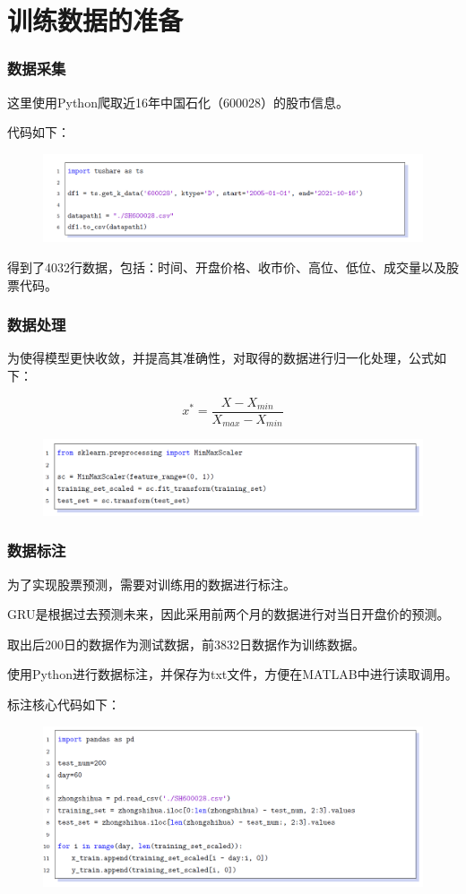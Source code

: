 \documentclass[aspectratio=169, 10pt, utf8, mathserif]{beamer}
\begin{document}
\section{训练数据的准备}
\begin{frame}
	\frametitle{数据采集}
	这里使用Python爬取近16年中国石化（600028）的股市信息。
	
	代码如下：
	\begin{figure}[H]
		\centering
		\includegraphics[width=1\linewidth]{pic/screenshot032}
		\label{fig:screenshot032}
	\end{figure}
	
得到了4032行数据，包括：时间、开盘价格、收市价、高位、低位、成交量以及股票代码。
\end{frame}	
\begin{frame}
	\frametitle{数据处理}
	为使得模型更快收敛，并提高其准确性，对取得的数据进行归一化处理，公式如下：
	
	\begin{equation}
		x^*=\frac{X-X_{min}}{X_{max}-X_{min}}
	\end{equation}
\begin{figure}[H]
	\centering
	\includegraphics[width=1\linewidth]{pic/screenshot033}
	\label{fig:screenshot033}
\end{figure}

\end{frame}	
\begin{frame}
	\frametitle{数据标注}
	为了实现股票预测，需要对训练用的数据进行标注。
	
	GRU是根据过去预测未来，因此采用前两个月的数据进行对当日开盘价的预测。
	
	取出后200日的数据作为测试数据，前3832日数据作为训练数据。
	
	使用Python进行数据标注，并保存为txt文件，方便在MATLAB中进行读取调用。
	
	标注核心代码如下：
	\begin{figure}[H]
		\centering
		\includegraphics[width=0.7\linewidth]{pic/screenshot034}
		\label{fig:screenshot034}
	\end{figure}
	
\end{frame}	
\end{document}
